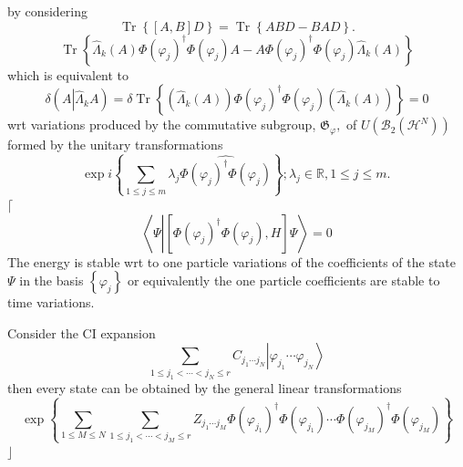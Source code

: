 \documentclass[aps,preprint]{revtex4}%
\begin{document}
by considering%
\begin{equation}
\operatorname{Tr}\left\{  \left[  A,B\right]  D\right\}  =\operatorname{Tr}%
\left\{  ABD-BAD\right\}  .
\end{equation}%
\begin{equation}
\operatorname{Tr}\left\{  \widehat{\Lambda}_{k}\left(  A\right)  \Phi\left(
\varphi_{j}\right)  ^{\dagger}\Phi\left(  \varphi_{j}\right)  A-A\Phi\left(
\varphi_{j}\right)  ^{\dagger}\Phi\left(  \varphi_{j}\right)  \widehat
{\Lambda}_{k}\left(  A\right)  \right\}
\end{equation}
which is equivalent to
\begin{equation}
\delta\left(  A\left\vert \widehat{\Lambda}_{k}A\right.  \right)
=\delta\operatorname{Tr}\left\{  \left(  \widehat{\Lambda}_{k}\left(
A\right)  \right)  \Phi\left(  \varphi_{j}\right)  ^{\dagger}\Phi\left(
\varphi_{j}\right)  \left(  \widehat{\Lambda}_{k}\left(  A\right)  \right)
\right\}  =0
\end{equation}
wrt variations produced by the commutative subgroup, $\mathfrak{G}_{\varphi},$
of $U\left(  \mathcal{B}_{2}\left(  \mathcal{H}^{N}\right)  \right)  $ formed
by the unitary transformations
\begin{equation}
\exp i\left\{  \sum_{1\leq j\leq m}\lambda_{j}\widehat{\Phi\left(  \varphi
_{j}\right)  ^{\dagger}\Phi\left(  \varphi_{j}\right)  }\right\}  ;\lambda
_{j}\in\mathbb{R},1\leq j\leq m.\,
\end{equation}
$\lceil$%
\begin{equation}
\left\langle \Psi\left\vert \left[  \Phi\left(  \varphi_{j}\right)  ^{\dagger
}\Phi\left(  \varphi_{j}\right)  ,H\right]  \Psi\right.  \right\rangle =0
\end{equation}
The energy is stable wrt to one particle variations of the coefficients of the
state $\Psi$ in the basis $\left\{  \varphi_{j}\right\}  $ or equivalently the
one particle coefficients are stable to time variations.

Consider the CI expansion
\begin{equation}
\sum_{1\leq j_{1}<\cdots<j_{N}\leq r}C_{j_{1}\cdots j_{N}}\left\vert
\varphi_{j_{1}}\cdots\varphi_{j_{N}}\right\rangle
\end{equation}
then every state can be obtained by the general linear transformations
\begin{equation}
\exp\left\{  \sum_{1\leq M\leq N}\sum_{1\leq j_{1}<\cdots<j_{M}\leq r}%
Z_{j_{1}\cdots j_{M}}\Phi\left(  \varphi_{j_{1}}\right)  ^{\dagger}\Phi\left(
\varphi_{j_{1}}\right)  \cdots\Phi\left(  \varphi_{j_{M}}\right)  ^{\dagger
}\Phi\left(  \varphi_{j_{M}}\right)  \right\}
\end{equation}
$\rfloor$
\end{document}
